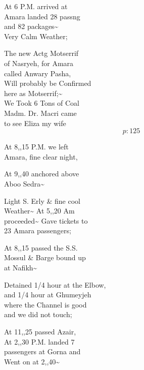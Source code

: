 \documentclass{report}
\begin{document}
	\par{
 	At 6 P.M. arrived at\ \\Amara landed 28 passng\ \\and 82 packages\~{}\ \\Very Calm Weather;\ \\
	}

	\par{
 	The new Actg Motserrif\ \\of Nasryeh, for Amara\ \\called Anwary Pasha,\ \\Will probably be Confirmed\ \\here as Motserrif;\~{}\ \\We Took 6 Tons of Coal\ \\Madm. Dr. Macri came\ \\to see Eliza my wife\ \\
  \[p: 125 \]

	}


	\par{
 	At 8,,15 P.M. we left\ \\Amara, fine clear night,\ \\
	}

	\par{
 	At 9,,40 anchored above\ \\Aboo Sedra\~{}\ \\
	}

	\par{
 	Light S. Erly \& fine cool\ \\Weather\~{} At 5,,20 Am\ \\proceeded\~{} Gave tickets to\ \\23 Amara passengers;\ \\
	}

	\par{
 	At 8,,15 passed the S.S.\ \\Mossul \& Barge bound up\ \\at Nafikh\~{}\ \\
	}

	\par{
 	Detained 1/4 hour at the Elbow,\ \\and 1/4 hour at Ghumeyjeh\ \\where the Channel is good\ \\and we did not touch;\ \\
	}

	\par{
 	At 11,,25 passed Azair,\ \\At 2,,30 P.M. landed 7\ \\passengers at Gorna and\ \\Went on at 2,,40\~{}\ \\
	}
\end{document}
